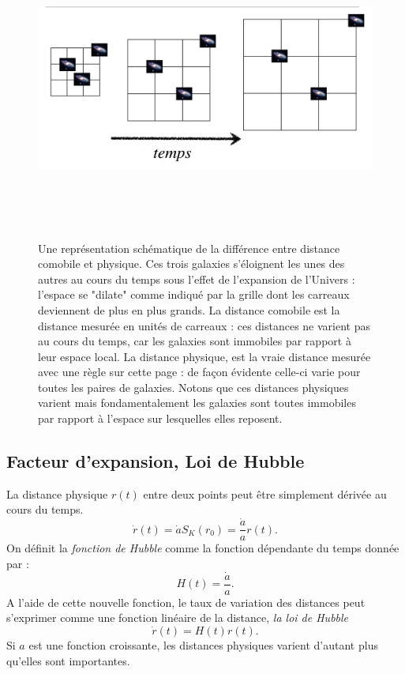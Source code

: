 \begin{figure}[htbp]
	\centering
		\includegraphics[height=10cm]{figs/grille.png}
	\caption[Coordonnées comobiles et expansion]{Une représentation schématique de la différence entre distance comobile et physique. Ces trois galaxies s'éloignent les unes des autres au cours du temps sous l'effet de l'expansion de l'Univers : l'espace se "dilate" comme indiqué par la grille dont les carreaux deviennent de plus en plus grands. La distance comobile est la distance mesurée en unités de carreaux : ces distances ne varient pas au cours du temps, car les galaxies sont immobiles par rapport à leur espace local. La distance physique, est la vraie distance mesurée avec une règle sur cette page : de façon évidente celle-ci varie pour toutes les paires de galaxies. Notons que ces distances physiques varient mais fondamentalement les galaxies sont toutes immobiles par rapport à l'espace sur lesquelles elles reposent.}
	\label{f:grille}
\end{figure}

\subsection{Facteur d'expansion, Loi de Hubble}
La distance physique $r(t)$ entre deux points peut être simplement dérivée au cours du temps.
\begin{equation}
\dot r(t)= \dot a S_K(r_0) =\frac{\dot a}{a}r(t).
\end{equation}
On définit la \textit{fonction de Hubble} comme la fonction dépendante du temps donnée par :
\begin{equation}
H(t)=\frac{\dot a}{a}.
\label{e:hubble}
\end{equation}
A l'aide de cette nouvelle fonction, le taux de variation des distances peut s'exprimer comme une fonction linéaire de la distance, \textit{la loi de Hubble}
\begin{equation}
\dot r(t) = H(t) r(t).
\label{e:hubble2}
\end{equation}
Si $a$ est une fonction croissante, les distances physiques varient d'autant plus qu'elles sont importantes.

